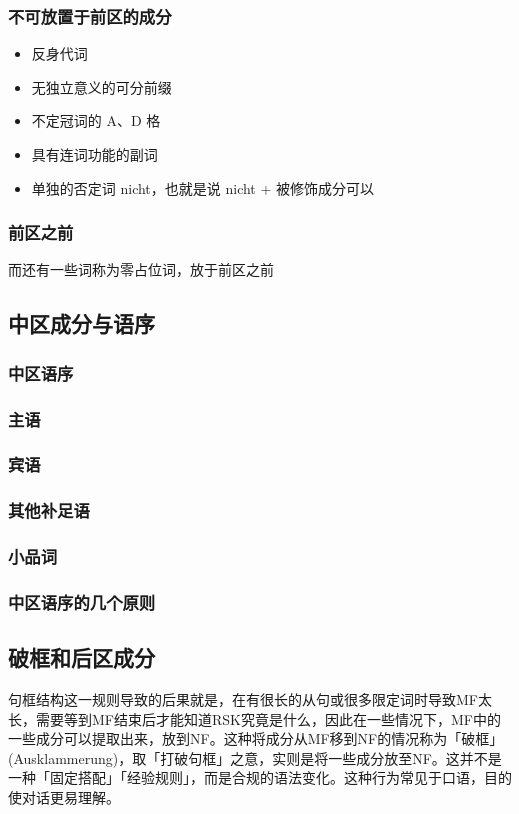 \subsubsection{不可放置于前区的成分}
\begin{itemize}
    \item 反身代词
    \item 无独立意义的可分前缀
    \item 不定冠词的 A、D 格
    \item 具有连词功能的副词
    \item 单独的否定词 nicht，也就是说 nicht + 被修饰成分可以
\end{itemize}

\subsubsection{前区之前}
而还有一些词称为零占位词，放于前区之前

\subsection{中区成分与语序}

\subsubsection{中区语序}
\subsubsection{主语}
\subsubsection{宾语}
\subsubsection{其他补足语}
\subsubsection{小品词}
\subsubsection{中区语序的几个原则}


\subsection{破框和后区成分}


句框结构这一规则导致的后果就是，在有很长的从句或很多限定词时导致MF太长，需要等到MF结束后才能知道RSK究竟是什么，因此在一些情况下，MF中的一些成分可以提取出来，放到NF。这种将成分从MF移到NF的情况称为「破框」(Ausklammerung)，取「打破句框」之意，实则是将一些成分放至NF。这并不是一种「固定搭配」「经验规则」，而是合规的语法变化。这种行为常见于口语，目的使对话更易理解。


